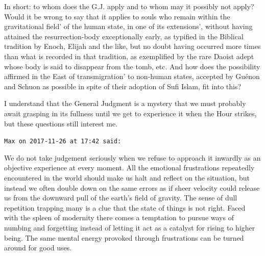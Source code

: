 \begin{footnotesize}
\begin{sffamily}
In short: to whom does the G.J. apply and to whom may it possibly not apply? Would it be wrong to say that it applies to
souls who remain within the gravitational field' of the human state, in one of its
extensions’, without having attained the resurrection-body exceptionally early, as typified in
the Biblical tradition by Enoch, Elijah and the like, but no doubt having occurred more times than what is recorded in
that tradition, as exemplified by the rare Daoist adept whose body is said to disappear from the tomb, etc. And how
does the possibility affirmed in the East of transmigration' to non-human states, accepted by
Guénon and Schuon as possible in spite of their adoption of Sufi Islam, fit into this? 

I understand that the General Judgment is a mystery that we must probably await grasping in its fullness until we get to
experience it when the Hour strikes, but these questions still interest me.


\hfill

\texttt{Max on 2017-11-26 at 17:42 said: }

We do not take judgement seriously when we refuse to approach it inwardly as an objective experience at every moment.
All the emotional frustrations repeatedly encountered in the world should make us halt and reflect on the situation,
but instead we often double down on the same errors as if sheer velocity could release us from the downward pull of the
earth's field of gravity. The sense of dull repetition trapping many is a clue that the state of things is
not right. Faced with the spleen of modernity there comes a temptation to pursue ways of numbing and forgetting instead
of letting it act as a catalyst for rising to higher being. The same mental energy provoked through frustrations can be
turned around for good uses.

\end{sffamily}\end{footnotesize}